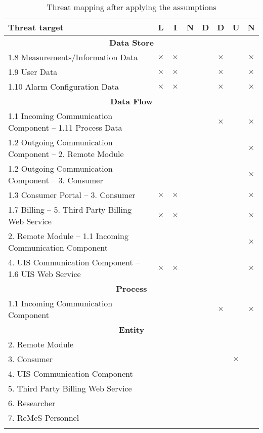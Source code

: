 \begin{center}
	\begin{longtable}{p{9cm}ccccccc}
	\toprule[1pt]
	\bf Threat target & \bf L & \bf I & \bf N & \bf D & \bf D & \bf U & \bf N \\
	\midrule[0.5pt]
	\multicolumn{8}{c}{\textbf{Data Store}} \\
	\midrule[0.5pt]
	\footnotesize 1.8 Measurements/Information Data & $\times$ & $\times$ &  &  & $\times$ &  & $\times$ \\
	\footnotesize 1.9 User Data 					& $\times$ & $\times$ &  &  & $\times$ &  & $\times$ \\
	\footnotesize 1.10 Alarm Configuration Data 	& $\times$ & $\times$ &  &  & $\times$ &  & $\times$ \\
	\midrule[0.5pt]
	\multicolumn{8}{c}{\textbf{Data Flow}} \\
	\midrule[0.5pt]
	\footnotesize 1.1 Incoming Communication Component -- 1.11 Process Data &          &          &  &  & $\times$ & & $\times$ \\
	\footnotesize 1.2 Outgoing Communication Component -- 2. Remote Module 	&          &          &  &  &          & & $\times$ \\
	\footnotesize 1.2 Outgoing Communication Component -- 3. Consumer 		&          &          &  &  &          & & $\times$ \\
	\footnotesize 1.3 Consumer Portal -- 3. Consumer 						& $\times$ & $\times$ &  &  &          & & $\times$ \\
	\footnotesize 1.7 Billing -- 5. Third Party Billing Web Service 		& $\times$ & $\times$ &  &  &          & & $\times$ \\
	\footnotesize 2. Remote Module -- 1.1 Incoming Communication Component  &          &          &  &  &          & & $\times$ \\
	\footnotesize 4. UIS Communication Component -- 1.6 UIS Web Service  	& $\times$ & $\times$ &  &  &          & & $\times$ \\
	\midrule[0.5pt]
	\multicolumn{8}{c}{\textbf{Process}} \\
	\midrule[0.5pt]
	\footnotesize 1.1 Incoming Communication Component 	&  &  &  &  & $\times$ & & $\times$ \\
	\midrule[0.5pt]
	\multicolumn{8}{c}{\textbf{Entity}} \\
	\midrule[0.5pt]
	\footnotesize 2. Remote Module 						&  &  &  &  &  &          & \\
	\footnotesize 3. Consumer 							&  &  &  &  &  & $\times$ & \\
	\footnotesize 4. UIS Communication Component 		&  &  &  &  &  &          & \\
	\footnotesize 5. Third Party Billing Web Service 	&  &  &  &  &  &          & \\
	\footnotesize 6. Researcher 						&  &  &  &  &  &          & \\
	\footnotesize 7. ReMeS Personnel 					&  &  &  &  &  &          & \\
	\bottomrule[1pt]
	\caption{Threat mapping after applying the assumptions}
	\label{table:threat-map-reduced}
	\end{longtable}
\end{center}


